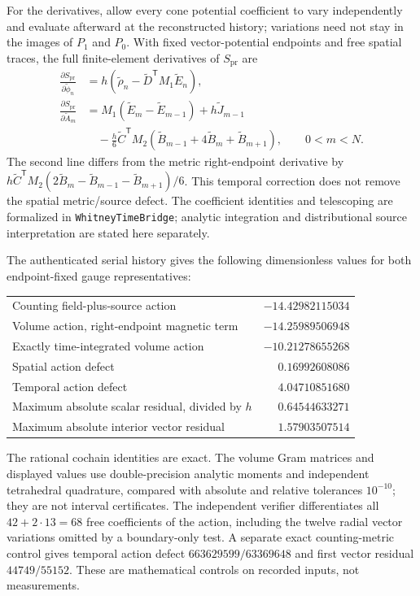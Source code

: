 For the derivatives, allow every cone potential coefficient to vary
independently and evaluate afterward at the reconstructed history; variations
need not stay in the images of \(P_1\) and \(P_0\).
With fixed vector-potential endpoints and free spatial traces, the full
finite-element derivatives of \(S_{\mathrm{pr}}\) are
\begin{align*}
 \frac{\partial S_{\mathrm{pr}}}{\partial\widetilde\phi_n}
 &=h\left(\widetilde\rho_n-\widetilde D^{\mathsf T}M_1\widetilde E_n\right),\\
 \frac{\partial S_{\mathrm{pr}}}{\partial\widetilde A_m}
 &=M_1(\widetilde E_m-\widetilde E_{m-1})+h\widetilde J_{m-1}\\
 &\quad-\frac h6\widetilde C^{\mathsf T}M_2
 (\widetilde B_{m-1}+4\widetilde B_m+\widetilde B_{m+1}),
 \qquad 0<m<N.
\end{align*}
The second line differs from the metric right-endpoint derivative by
\(h\widetilde C^{\mathsf T}M_2(2\widetilde B_m-
\widetilde B_{m-1}-\widetilde B_{m+1})/6\).
This temporal correction does not remove the spatial metric/source defect.
The coefficient identities and telescoping are formalized in
\texttt{WhitneyTimeBridge}; analytic integration and
distributional source interpretation are stated here separately.

The authenticated serial history gives the following dimensionless values
for both endpoint-fixed gauge representatives:
\begin{center}
\begin{tabular}{lr}
Counting field-plus-source action & $-14.42982115034$\\
Volume action, right-endpoint magnetic term & $-14.25989506948$\\
Exactly time-integrated volume action & $-10.21278655268$\\
Spatial action defect & $0.16992608086$\\
Temporal action defect & $4.04710851680$\\
Maximum absolute scalar residual, divided by $h$ & $0.64544633271$\\
Maximum absolute interior vector residual & $1.57903507514$
\end{tabular}
\end{center}
The rational cochain identities are exact. The volume Gram matrices and
displayed values use double-precision analytic moments and independent
tetrahedral quadrature, compared with absolute and relative tolerances
\(10^{-10}\); they are not interval certificates. The independent verifier
differentiates all \(42+2\cdot13=68\) free coefficients of the action,
including the twelve radial vector variations omitted by a boundary-only
test. A separate exact counting-metric control gives temporal action defect
\(663629599/63369648\) and first vector residual \(44749/55152\).
These are mathematical controls on recorded inputs, not measurements.

